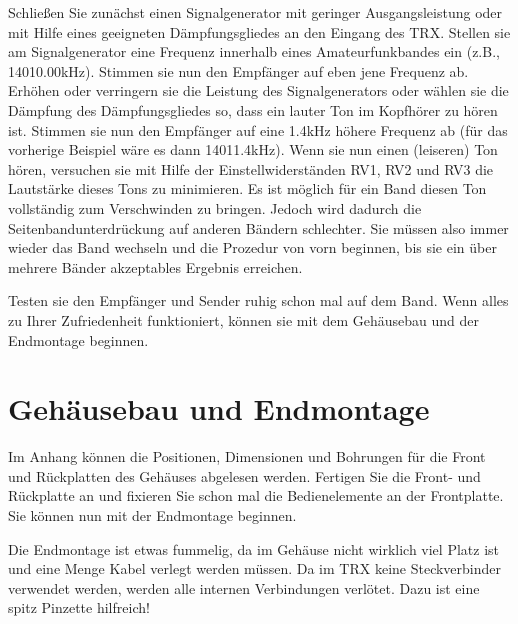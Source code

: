 \documentclass[10pt, a4paper]{paper}
\begin{document}
Schließen Sie zunächst einen Signalgenerator mit geringer Ausgangsleistung oder mit Hilfe eines geeigneten Dämpfungsgliedes an den Eingang des TRX. Stellen sie am Signalgenerator eine Frequenz innerhalb eines Amateurfunkbandes ein (z.B., 14010.00kHz). Stimmen sie nun den Empfänger auf eben jene Frequenz ab. Erhöhen oder verringern sie die Leistung des Signalgenerators oder wählen sie die Dämpfung des Dämpfungsgliedes so, dass ein lauter Ton im Kopfhörer zu hören ist. Stimmen sie nun den Empfänger auf eine 1.4kHz höhere Frequenz ab (für das vorherige Beispiel wäre es dann 14011.4kHz). Wenn sie nun einen (leiseren) Ton hören, versuchen sie mit Hilfe der Einstellwiderständen RV1, RV2 und RV3 die Lautstärke dieses Tons zu minimieren. Es ist möglich für ein Band diesen Ton vollständig zum Verschwinden zu bringen. Jedoch wird dadurch die Seitenbandunterdrückung auf anderen Bändern schlechter. Sie müssen also immer wieder das Band wechseln und die Prozedur von vorn beginnen, bis sie ein über mehrere Bänder akzeptables Ergebnis erreichen. 

Testen sie den Empfänger und Sender ruhig schon mal auf dem Band. Wenn alles zu Ihrer Zufriedenheit funktioniert, können sie mit dem Gehäusebau und der Endmontage beginnen.

\clearpage
\section{Gehäusebau und Endmontage} \label{sec:box}

Im Anhang können die Positionen, Dimensionen und Bohrungen für die Front und Rückplatten des Gehäuses abgelesen werden. Fertigen Sie die Front- und Rückplatte an und fixieren Sie schon mal die Bedienelemente an der Frontplatte. Sie können nun mit der Endmontage beginnen.

Die Endmontage ist etwas fummelig, da im Gehäuse nicht wirklich viel Platz ist und eine Menge Kabel verlegt werden müssen. Da im TRX keine Steckverbinder verwendet werden, werden alle internen Verbindungen verlötet. Dazu ist eine spitz Pinzette hilfreich!
\end{document}
